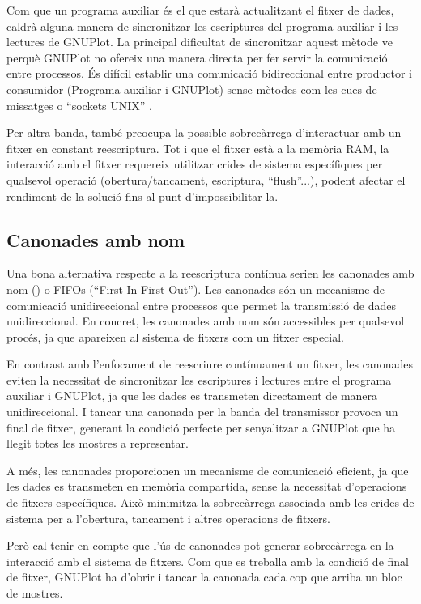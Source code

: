 \documentclass{tfgitic}[2023/06/30]
\begin{document}
Com que un programa auxiliar és el que estarà actualitzant el fitxer
de dades, caldrà alguna manera de sincronitzar les escriptures del
programa auxiliar i les lectures de GNUPlot. La principal dificultat
de sincronitzar aquest mètode ve perquè GNUPlot no ofereix una manera
directa per fer servir la comunicació entre processos. És difícil
establir una comunicació bidireccional entre productor i consumidor
(Programa auxiliar i GNUPlot) sense mètodes com les cues de missatges
\cite{cues-missatges} o ``sockets UNIX'' \cite{sockets-unix}.

Per altra banda, també preocupa la possible sobrecàrrega d'interactuar
amb un fitxer en constant reescriptura. Tot i que el fitxer està a la
memòria RAM, la interacció amb el fitxer requereix utilitzar crides de
sistema específiques per qualsevol operació (obertura/tancament,
escriptura, ``flush''...), podent afectar el rendiment de la solució
fins al punt d'impossibilitar-la.

\subsection{Canonades amb nom}

Una bona alternativa respecte a la reescriptura contínua serien les
canonades amb nom (\cite[``Named Pipes'']{canonades-nom}) o FIFOs
(``First-In First-Out''). Les canonades són un mecanisme de
comunicació unidireccional entre processos que permet la transmissió
de dades unidireccional. En concret, les canonades amb nom són
accessibles per qualsevol procés, ja que apareixen al sistema de
fitxers com un fitxer especial.

En contrast amb l'enfocament de reescriure contínuament un fitxer, les
canonades eviten la necessitat de sincronitzar les escriptures i
lectures entre el programa auxiliar i GNUPlot, ja que les dades es
transmeten directament de manera unidireccional. I tancar una canonada
per la banda del transmissor provoca un final de fitxer, generant la
condició perfecte per senyalitzar a GNUPlot que ha llegit totes les
mostres a representar.

A més, les canonades proporcionen un mecanisme de comunicació
eficient, ja que les dades es transmeten en memòria compartida, sense
la necessitat d'operacions de fitxers específiques. Això minimitza la
sobrecàrrega associada amb les crides de sistema per a l'obertura,
tancament i altres operacions de fitxers.

Però cal tenir en compte que l'ús de canonades pot generar
sobrecàrrega en la interacció amb el sistema de fitxers. Com que es
treballa amb la condició de final de fitxer, GNUPlot ha d'obrir i
tancar la canonada cada cop que arriba un bloc de mostres.
\end{document}
